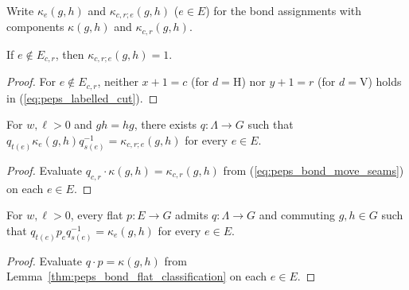 \begin{definition}%
    \label{def:peps_labelled_closure}
    \leanok
    Write $\kappa_e(g,h)$ and $\kappa_{c,r;e}(g,h)$ ($e\in E$) for the bond assignments with components $\kappa(g,h)$ and $\kappa_{c,r}(g,h)$.
\end{definition}

\begin{lemma}%
    \label{thm:peps_labelled_closure_support}
    \leanok
    If $e\notin E_{c,r}$, then $\kappa_{c,r;e}(g,h)=1$.
\end{lemma}
\begin{proof}\leanok
    For $e\notin E_{c,r}$, neither $x+1=c$ (for $d=\mathrm H$) nor $y+1=r$ (for $d=\mathrm V$) holds in (\ref{eq:peps_labelled_cut}).
\end{proof}

\begin{lemma}%
    \label{thm:peps_labelled_closure_gauge}
    \leanok
    For $w,\ell>0$ and $gh=hg$, there exists $q:\Lambda\to G$ such that $q_{t(e)}\kappa_e(g,h)q_{s(e)}^{-1}=\kappa_{c,r;e}(g,h)$ for every $e\in E$.
\end{lemma}
\begin{proof}\leanok
    Evaluate $q_{c,r}\cdot\kappa(g,h)=\kappa_{c,r}(g,h)$ from (\ref{eq:peps_bond_move_seams}) on each $e\in E$.
\end{proof}

\begin{lemma}%
    \label{thm:peps_labelled_flat_classification}
    \leanok
    For $w,\ell>0$, every flat $p:E\to G$ admits $q:\Lambda\to G$ and commuting $g,h\in G$ such that $q_{t(e)}p_eq_{s(e)}^{-1}=\kappa_e(g,h)$ for every $e\in E$.
\end{lemma}
\begin{proof}\leanok
    Evaluate $q\cdot p=\kappa(g,h)$ from Lemma~\ref{thm:peps_bond_flat_classification} on each $e\in E$.
\end{proof}

